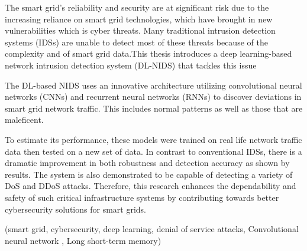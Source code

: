 \begin{abstractEn}
	

	The smart grid's reliability and security are at significant risk due to the increasing reliance on smart grid technologies, which have brought in new vulnerabilities which is cyber threats. Many traditional intrusion detection systems (IDSs) are unable to detect most of these threats because of the complexity and  of smart grid data.This thesis introduces a deep learning-based network intrusion detection system (DL-NIDS) that tackles this issue

	The DL-based NIDS uses an innovative architecture utilizing convolutional neural networks (CNNs) and recurrent neural networks (RNNs) to discover deviations in smart grid network traffic. This includes normal patterns as well as those that are maleficent.

	To estimate its performance, these models were trained on real life network traffic data then tested on a new set of data. In contrast to conventional IDSs, there is a dramatic improvement in both robustness and detection accuracy as shown by results. The system is also demonstrated to be capable of detecting a variety of DoS and DDoS attacks. Therefore, this research enhances the dependability and safety of such critical infrastructure systems by contributing towards better cybersecurity solutions for smart grids.


\end{abstractEn}

\begin{keywordsEn}
	(smart grid, cybersecurity, deep learning, denial of service attacks, Convolutional neural network , Long short-term memory)
\end{keywordsEn}



